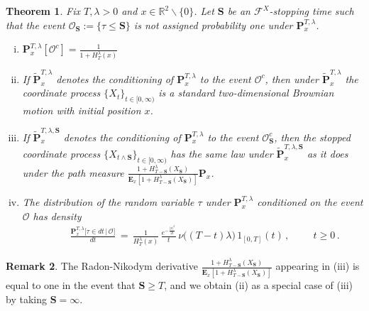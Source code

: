\documentclass[10pt]{article}
\numberwithin{equation}{section}
\newtheorem{theorem}{Theorem}[section]
\theoremstyle{definition}
\newtheorem{remark}[theorem]{Remark}
\newcommand{\R}{{\mathbb R}}
\begin{document}
\begin{theorem} \label{CorSubMART}  Fix $T,\lambda > 0$ and $x\in \R^2\backslash \{0\}$. Let $\mathbf{S}$ be an $\mathscr{F}^X$-stopping time such that the event  $\mathcal{O}_{\mathbf{S}}:=\{ \tau \leq \mathbf{S}\}$ is not assigned probability one under $\mathbf{P}_{x }^{T,\lambda}$. 
\begin{enumerate}[(i)]
\item  $\mathbf{P}_{x }^{T,\lambda}[\mathcal{O}^c]=\frac{1}{1+H_{T}^{\lambda}(x)  }$



\item If $\mathbf{\widetilde{P}}_{x }^{T,\lambda} $ denotes the conditioning of $\mathbf{P}_{x}^{T,\lambda }$ to the event $\mathcal{O}^c$, then under $\mathbf{\widetilde{P}}_{x }^{T,\lambda}$  the  coordinate process $\{X_t \}_{t\in [0,\infty)}$  is a standard two-dimensional Brownian motion with initial position $x$. 




\item  If $\mathbf{\widetilde{P}}_{x }^{T,\lambda,\mathbf{S}} $ denotes the conditioning of $\mathbf{P}_{x}^{T,\lambda }$ to the event $\mathcal{O}^{c}_{\mathbf{S}}$, then  the stopped coordinate  process $\{X_{t\wedge \mathbf{S}} \}_{t\in [0,\infty)}$ has the same  law   under $\mathbf{\widetilde{P}}_{x}^{T,\lambda,\mathbf{S}} $ as it does under the path measure
 $ \frac{  1+H_{T-\mathbf{S} }^{\lambda}(X_{\mathbf{S}})   }{\mathbf{E}_{x}[ 1+H_{T-\mathbf{S} }^{\lambda}(X_{\mathbf{S}})  ]  } \mathbf{P}_{x}$.


\item  The distribution of the random variable $\tau$ under $\mathbf{P}_{x }^{T,\lambda}$ conditioned on the event $\mathcal{O}$  has density
\begin{align*}
 \text{}\hspace{1cm}\frac{\mathbf{P}_{x }^{T,\lambda}\big[\tau \in dt\,\big|\,\mathcal{O}\big] }{dt}\,=\,\frac{1}{H_{T}^{\lambda}(x)  }  \, \frac{ e^{-\frac{|x|^2 }{2t } }   }{ t }\,\nu\big( (T-t)\lambda\big)\, 1_{[0,T]}(t)\,,  \hspace{1cm} t\geq 0 \,.
 \end{align*}


\end{enumerate}

\end{theorem}
\begin{remark} The Radon-Nikodym derivative $ \frac{  1+H_{T-\mathbf{S} }^{\lambda}(X_{\mathbf{S}})   }{\mathbf{E}_{x}[ 1+H_{T-\mathbf{S} }^{\lambda}(X_{\mathbf{S}})  ]  }$ appearing in (iii) is equal to one in the event that $\mathbf{S}\geq T$, and we obtain (ii) as a special case of (iii) by taking $\mathbf{S}=\infty$.    
\end{remark}
\end{document}
